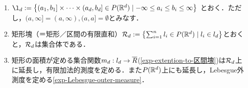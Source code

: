 \documentclass[uplatex, dvipdfmx]{jsreport}
\begin{document}
\begin{notation}[矩形／区間，矩形塊]\mbox{}
    \begin{enumerate}
        \item $\l_d:=\Brace{(a_1,b_1]\times\cdots\times(a_d,b_d]\in P(\R^d)\mid-\infty\le a_i\le b_i\le\infty}$
        とおく．ただし，$(a,\infty]=(a,\infty),(a,a]=\emptyset$とみなす．
        \item 矩形塊（＝矩形／区間の有限直和）$\mathcal{R}_d:=\left\{\sum_{i=1}^nl_i\in P(\mathbb{R}^d)\mid l_i\in l_d\right\}$とおくと，$\mathcal{R}_d$は集合体である．
        \item 矩形の面積が定める集合関数$m_d:l_d\to\overline{R}$(\ref{exp-extention-to-区間塊})は$\mathcal{R}_d$上に延長し，有限加法的測度を定める．また$P(\mathbb{R}^d)$上にも延長し，Lebesgue外測度を定める\ref{exp-Lebesgue-outer-measure}．
    \end{enumerate}
\end{notation}
\end{document}
